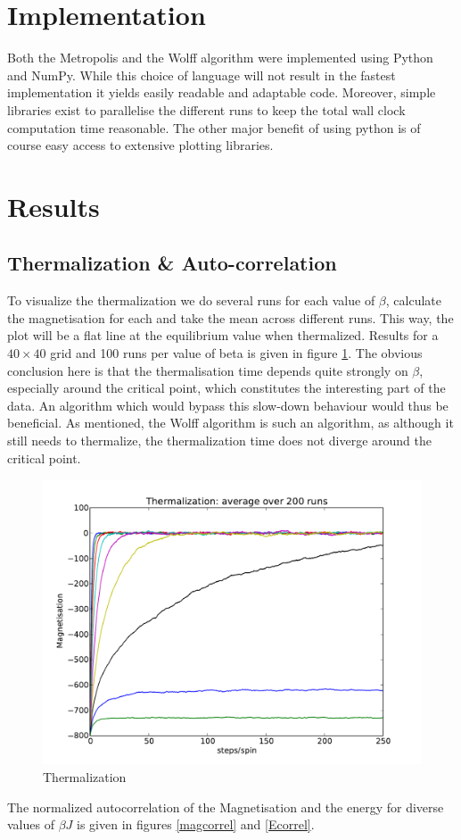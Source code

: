 \documentclass[11pt,twocolumn]{article}
\begin{document}
\section{Implementation}
Both the Metropolis and the Wolff algorithm were implemented using Python and NumPy. While this choice of language will not result in the fastest implementation it yields easily readable and adaptable code. 
Moreover, simple libraries exist to parallelise the different runs to keep the total wall clock computation time reasonable.
The other major benefit of using python is of course easy access to extensive plotting libraries.
\section{Results}
\subsection{Thermalization \& Auto-correlation}
To visualize the thermalization we do several runs for each value of $\beta$, calculate the magnetisation for each and take the mean across different runs. This way, the plot will be a flat line at the equilibrium value when thermalized. Results for a $40\times40$ grid and 100 runs per value of beta is given in figure \ref{therm}. The obvious conclusion here is that the thermalisation time depends quite strongly on $\beta$, especially around the critical point, which constitutes the interesting part of the data. An algorithm which would bypass this slow-down behaviour would thus be beneficial. As mentioned, the Wolff algorithm is such an algorithm, as although it still needs to thermalize, the thermalization time does not diverge around the critical point.
\begin{figure}[!ht]
\centering \includegraphics[width=\columnwidth]{figs/therm.pdf}
\caption{Thermalization}
\label{therm}
\end{figure}
The normalized autocorrelation of the Magnetisation and the energy for diverse values of $\beta J$ is given in figures \ref{magcorrel} and \ref{Ecorrel}.
\end{document}
